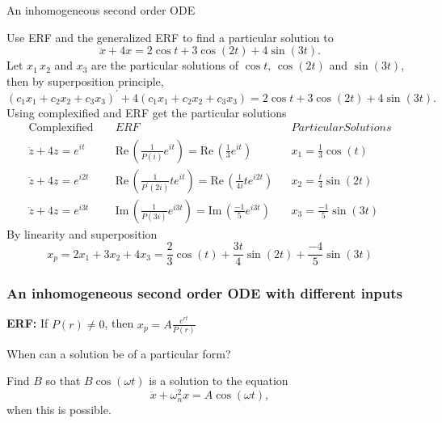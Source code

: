 \begin{problem}
  An inhomogeneous second order ODE
\end{problem}
Use ERF and the generalized ERF to find a particular solution to
\begin{equation*}
  \ddot x + 4x = 2\cos t + 3\cos (2t) + 4\sin (3t).
\end{equation*}
Let $x_1\, x_2$ and $x_3$ are the particular solutions of
$\cos t,\, \cos (2t)$ and $\sin (3t)$, then by superposition principle,
\begin{equation*}
  (c_1 x_1 + c_2 x_2 + c_3 x_3)^{\prime} + 4 (c_1 x_1 + c_2 x_2 + c_3 x_3) =
  2\cos t + 3\cos (2t) + 4\sin (3t).
\end{equation*}
Using complexified and ERF get the particular solutions
\begin{align*}
  &\text{Complexified }&
  &ERF&
  &Particular Solutions& \\
  &\ddot z + 4z = e^{it}&
  &\mathrm{Re\, }(\frac{1}{P(i)} e^{it}) = \mathrm{Re\, }(\frac{1}{3} e^{it}) &
  &x_1 = \frac{1}{3} \cos (t) \\                                                
  &\ddot z + 4z = e^{i2t}&
  &\mathrm{Re\, }(\frac{1}{P^{\prime}(2i)} te^{it}) = \mathrm{Re\, }(\frac{1}{4i} te^{i2t}) &
  &x_ 2 =\frac{t}{4} \sin (2t) \\
  &\ddot z + 4z = e^{i3t} &
  &\mathrm{Im\, }(\frac{1}{P(3i)} e^{i3t}) = \mathrm{Im\, }(\frac{-1}{5} e^{i3t}) &
  &x_ 3 = \frac{-1}{5} \sin (3t) 
\end{align*}
By linearity and superposition
\begin{equation*}
  x_ p = 2 x_1 + 3 x_2 + 4 x_3 = \frac{2}{3} \cos (t)
  + \frac{3t}{4} \sin (2t) + \frac{-4}{5} \sin (3t) 
\end{equation*}
\clearpage
\subsubsection{An inhomogeneous second order ODE with different inputs}
\textbf{ERF: } If $P(r) \neq 0$, then $\displaystyle x_ p = A\frac{e^{rt}}{P(r)}$
\begin{problem}
  When can a solution be of a particular form?
\end{problem}
Find $B$ so that $B \cos⁡ (\omega t)$ is a solution to the equation
\begin{equation*}
  \ddot x+\omega _ n^2x=A\cos (\omega t),
\end{equation*}
when this is possible.\\

